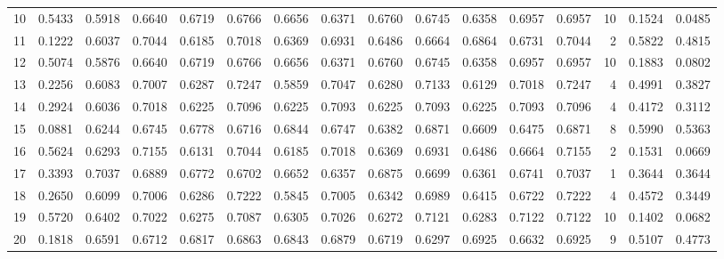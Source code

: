 \begin{tabular}{lrrrrrrrrrrrrrrr}
10  &      0.5433 &  0.5918 &  0.6640 &  0.6719 &  0.6766 &  0.6656 &  0.6371 &  0.6760 &  0.6745 &  0.6358 &   0.6957 &     0.6957 &     10 &                    0.1524 &                     0.0485 \\
11  &      0.1222 &  0.6037 &  0.7044 &  0.6185 &  0.7018 &  0.6369 &  0.6931 &  0.6486 &  0.6664 &  0.6864 &   0.6731 &     0.7044 &      2 &                    0.5822 &                     0.4815 \\
12  &      0.5074 &  0.5876 &  0.6640 &  0.6719 &  0.6766 &  0.6656 &  0.6371 &  0.6760 &  0.6745 &  0.6358 &   0.6957 &     0.6957 &     10 &                    0.1883 &                     0.0802 \\
13  &      0.2256 &  0.6083 &  0.7007 &  0.6287 &  0.7247 &  0.5859 &  0.7047 &  0.6280 &  0.7133 &  0.6129 &   0.7018 &     0.7247 &      4 &                    0.4991 &                     0.3827 \\
14  &      0.2924 &  0.6036 &  0.7018 &  0.6225 &  0.7096 &  0.6225 &  0.7093 &  0.6225 &  0.7093 &  0.6225 &   0.7093 &     0.7096 &      4 &                    0.4172 &                     0.3112 \\
15  &      0.0881 &  0.6244 &  0.6745 &  0.6778 &  0.6716 &  0.6844 &  0.6747 &  0.6382 &  0.6871 &  0.6609 &   0.6475 &     0.6871 &      8 &                    0.5990 &                     0.5363 \\
16  &      0.5624 &  0.6293 &  0.7155 &  0.6131 &  0.7044 &  0.6185 &  0.7018 &  0.6369 &  0.6931 &  0.6486 &   0.6664 &     0.7155 &      2 &                    0.1531 &                     0.0669 \\
17  &      0.3393 &  0.7037 &  0.6889 &  0.6772 &  0.6702 &  0.6652 &  0.6357 &  0.6875 &  0.6699 &  0.6361 &   0.6741 &     0.7037 &      1 &                    0.3644 &                     0.3644 \\
18  &      0.2650 &  0.6099 &  0.7006 &  0.6286 &  0.7222 &  0.5845 &  0.7005 &  0.6342 &  0.6989 &  0.6415 &   0.6722 &     0.7222 &      4 &                    0.4572 &                     0.3449 \\
19  &      0.5720 &  0.6402 &  0.7022 &  0.6275 &  0.7087 &  0.6305 &  0.7026 &  0.6272 &  0.7121 &  0.6283 &   0.7122 &     0.7122 &     10 &                    0.1402 &                     0.0682 \\
20  &      0.1818 &  0.6591 &  0.6712 &  0.6817 &  0.6863 &  0.6843 &  0.6879 &  0.6719 &  0.6297 &  0.6925 &   0.6632 &     0.6925 &      9 &                    0.5107 &                     0.4773 \\

\end{tabular}
